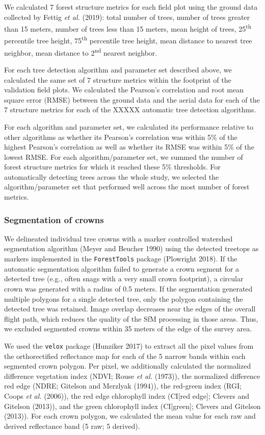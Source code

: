 \documentclass[]{article}
\begin{document}
We calculated 7 forest structure metrics for each field plot using the
ground data collected by Fettig \emph{et al.} (2019): total number of
trees, number of trees greater than 15 meters, number of trees less than
15 meters, mean height of trees, 25\textsuperscript{th} percentile tree
height, 75\textsuperscript{th} percentile tree height, mean distance to
nearest tree neighbor, mean distance to 2\textsuperscript{nd} nearest
neighbor.

For each tree detection algorithm and parameter set described above, we
calculated the same set of 7 structure metrics within the footprint of
the validation field plots. We calculated the Pearson's correlation and
root mean square error (RMSE) between the ground data and the aerial
data for each of the 7 structure metrics for each of the XXXXX automatic
tree detection algorithms.

For each algorithm and parameter set, we calculated its performance
relative to other algorithms as whether its Pearson's correlation was
within 5\% of the highest Pearson's correlation as well as whether its
RMSE was within 5\% of the lowest RMSE. For each algorithm/parameter
set, we summed the number of forest structure metrics for which it
reached these 5\% thresholds. For automatically detecting trees across
the whole study, we selected the algorithm/parameter set that performed
well across the most number of forest metrics.

\subsubsection{Segmentation of crowns}\label{segmentation-of-crowns}

We delineated individual tree crowns with a marker controlled watershed
segmentation algorithm (Meyer and Beucher 1990) using the detected
treetops as markers implemented in the \texttt{ForestTools} package
(Plowright 2018). If the automatic segmentation algorithm failed to
generate a crown segment for a detected tree (e.g., often snags with a
very small crown footprint), a circular crown was generated with a
radius of 0.5 meters. If the segmentation generated multiple polygons
for a single detected tree, only the polygon containing the detected
tree was retained. Image overlap decreases near the edges of the overall
flight path, which reduces the quality of the SfM processing in those
areas. Thus, we excluded segmented crowns within 35 meters of the edge
of the survey area.

We used the \texttt{velox} package (Hunziker 2017) to extract all the
pixel values from the orthorectified reflectance map for each of the 5
narrow bands within each segmented crown polygon. Per pixel, we
additionally calculated the normalized difference vegetation index
(NDVI; Rouse \emph{et al.} (1973)), the normalized difference red edge
(NDRE; Gitelson and Merzlyak (1994)), the red-green index (RGI; Coops
\emph{et al.} (2006)), the red edge chlorophyll index (CI{[}red edge{]};
Clevers and Gitelson (2013)), and the green chlorophyll index
(CI{[}green{]}; Clevers and Gitelson (2013)). For each crown polygon, we
calculated the mean value for each raw and derived reflectance band (5
raw; 5 derived).
\end{document}

